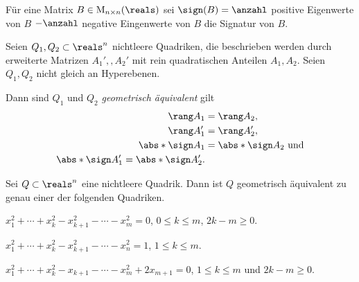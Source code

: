 Für eine Matrix \( B\in \Mat_{n\times n}(\reals) \) sei \( \sign(B)=\anzahl \) positive Eigenwerte von \( B \) \( -\anzahl \) negative Eingenwerte von \( B \) die Signatur von \( B \).
\begin{satz}
  Seien \( Q_1,Q_2\subset \reals^n \) nichtleere Quadriken, die beschrieben werden durch erweiterte Matrizen \( A_1',,A_2' \) mit rein quadratischen Anteilen \( A_1,A_2 \). Seien \( Q_1,Q_2 \) nicht gleich an Hyperebenen.

  Dann sind \( Q_1 \) und \( Q_2 \) \emph{geometrisch äquivalent} \gdw gilt
\begin{align*}
  \rang A_1&=\rang A_2,\\
  \rang A_1'&=\rang A_2',\\
  \abs*{\sign A_1}&=\abs*{\sign A_2}\text{ und}\\
  \abs*{\sign A_1'}=\abs*{\sign A_2'}.
\end{align*}
\end{satz}
\begin{folgerung}
  Sei \( Q\subset \reals^n \) eine nichtleere Quadrik. Dann ist \( Q \) geometrisch äquivalent zu genau einer der folgenden Quadriken.
  \begin{eigenschaftenenumerate}
    \item \label{quadriken_gleich_null_nur_quadrate}\( x_1^2+\dotsb+x_k^2-x_{k+1}^2-\dotsb-x_m^2=0 \), \( 0\leq k\leq m \), \( 2k-m\geq 0 \).
    \item \label{quadriken_gleich_eins}\( x_1^2+\dotsb+x_k^2-x_{k+1}^2-\dotsb-x_n^2=1 \), \( 1\leq k\leq m \).
    \item \label{qadriken_gleich_null_plus_ein_linearer}\( x_1^2+\dotsb+x_k^2-x_{k+1}-\dotsb-x_m^2+2x_{m+1}=0 \), \( 1\leq k\leq m \) und \( 2k-m\geq 0 \).
  \end{eigenschaftenenumerate}
\end{folgerung}
